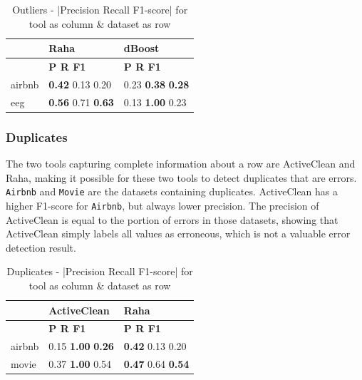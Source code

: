 \begin{table}[H]
\centering
\caption{Outliers - |Precision Recall F1-score| for tool as column \& dataset as row}
\begin{adjustbox}{center}
\begin{tabular}{lll}
\toprule
{} & Raha & dBoost \\
\midrule
 & \textbf{\space\space\space P \space\space\space\space R \space\space\space F1} & \textbf{\space\space\space P \space\space\space\space R \space\space\space F1} \\
airbnb & \textbf{0.42} 0.13 0.20 & 0.23 \textbf{0.38} \textbf{0.28} \\
eeg & \textbf{0.56} 0.71 \textbf{0.63} & 0.13 \textbf{1.00} 0.23 \\
\bottomrule
\end{tabular}
\end{adjustbox}

\end{table}

\subsubsection{Duplicates}
The two tools capturing complete information about a row are ActiveClean and Raha, making it possible for these two tools to detect duplicates that are errors. \verb|Airbnb| and \verb|Movie| are the datasets containing duplicates. ActiveClean has a higher F1-score for \verb|Airbnb|, but always lower precision. The precision of ActiveClean is equal to the portion of errors in those datasets, showing that ActiveClean simply labels all values as erroneous, which is not a valuable error detection result. 

\begin{table}[H]
\centering
\caption{Duplicates - |Precision Recall F1-score| for tool as column \& dataset as row}
\begin{adjustbox}{center}
\begin{tabular}{lll}
\toprule
{} & ActiveClean & Raha \\
\midrule
 & \textbf{\space\space\space P \space\space\space\space R \space\space\space F1} & \textbf{\space\space\space P \space\space\space\space R \space\space\space F1} \\
airbnb & 0.15 \textbf{1.00} \textbf{0.26} & \textbf{0.42} 0.13 0.20 \\
movie & 0.37 \textbf{1.00} 0.54 & \textbf{0.47} 0.64 \textbf{0.54} \\
\bottomrule
\end{tabular}
\end{adjustbox}
\end{table}

